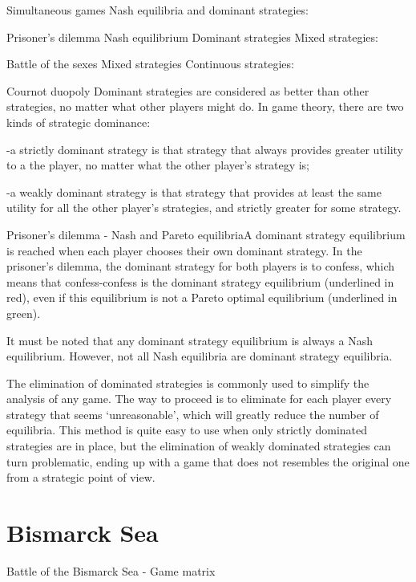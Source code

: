 Simultaneous games
Nash equilibria and dominant strategies:

Prisoner’s dilemma
Nash equilibrium
Dominant strategies
Mixed strategies:

Battle of the sexes
Mixed strategies
Continuous strategies:

Cournot duopoly
Dominant strategies are considered as better than other strategies, no matter what other players might do. In game theory, there are two kinds of strategic dominance:

-a strictly dominant strategy is that strategy that always provides greater utility to a the player, no matter what the other player’s strategy is;

-a weakly dominant strategy is that strategy that provides at least the same utility for all the other player’s strategies, and strictly greater for some strategy.

 

Prisoner's dilemma - Nash and Pareto equilibriaA dominant strategy equilibrium is reached when each player chooses their own dominant strategy. In the prisoner’s dilemma, the dominant strategy for both players is to confess, which means that confess-confess is the dominant strategy equilibrium (underlined in red), even if this equilibrium is not a Pareto optimal equilibrium (underlined in green).

It must be noted that any dominant strategy equilibrium is always a Nash equilibrium. However, not all Nash equilibria are dominant strategy equilibria.

 

The elimination of dominated strategies is commonly used to simplify the analysis of any game. The way to proceed is to eliminate for each player every strategy that seems ‘unreasonable’, which will greatly reduce the number of equilibria. This method is quite easy to use when only strictly dominated strategies are in place, but the elimination of weakly dominated strategies can turn problematic, ending up with a game that does not resembles the original one from a strategic point of view.

\section{Bismarck Sea}
Battle of the Bismarck Sea - Game matrix

